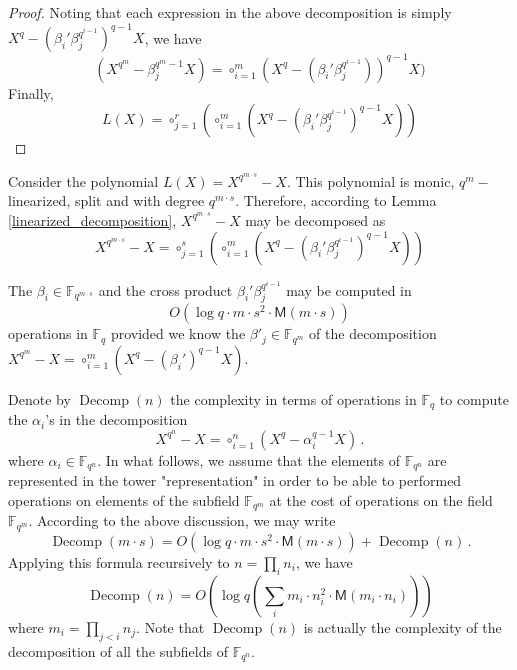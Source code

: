 \documentclass{sig-alternate}
\newcommand{\ff}[1]{\mathbb{F}_{#1}}
\newcommand{\qq}{q}
\newcommand{\nn}{n}
\newcommand{\qn}{{\qq^\nn}}
\newcommand{\basef}{\ff{\qq}}
\newcommand{\extf}{\ff{\qn}}
\DeclareMathOperator{\Decomp}{Decomp}
\newcommand{\bigO}{O}
\newcommand{\Mul}{\mathsf{M}}
\begin{document}
\begin{proof}
Noting that each expression in the above decomposition is simply $X^\qq-(  \beta_i'  \beta_j^{\qq^{i-1}})^{q-1}  X$, we have
\begin{equation}
\label{decomp_partial}
(X^{\qq^{m}}- \beta_j^{\qq^{m}-1} X)=\circ_{i=1}^{m} (X^\qq-(\beta_i' \beta_j^{\qq^{i-1}}) )^{q-1} X)
\end{equation}
Finally,
\begin{equation}
\label{decomp_total}
L(X)=\circ_{j=1}^{r} \left( \circ_{i=1}^{m} (X^\qq-(\beta_i'  \beta_j^{\qq^{i-1}})^{q-1}   X) \right)
\end{equation}
\medskip
\end{proof}



Consider the polynomial $L(X)=X^{\qq^{m \cdot s}}-X$. This polynomial is monic, $\qq^{m}-$linearized, split and with degree $\qq^{m \cdot s}$. Therefore, according to Lemma~
\ref{linearized_decomposition}, $X^{\qq^{m \cdot s}}-X$ may be decomposed as 
$$X^{\qq^{m\cdot s}}-X=\circ_{j=1}^{s} \left( \circ_{i=1}^{m} (X^\qq-(\beta_i'  \beta_j^{\qq^{i-1}})^{q-1}   X) \right)$$

The $\beta_i \in \mathbb{F}_{\qq^{m \cdot s}}$ and the cross product $\beta_i'  \beta_j^{\qq^{i-1}}$ may be computed in 
$$\bigO(\log q \cdot m \cdot s^2 \cdot \Mul(m \cdot s))$$
operations in $\basef$ provided we know the $\beta'_j \in \mathbb{F}_{\qq^m}$ of the decomposition $X^{\qq^{m}}-X=\circ_{i=1}^{m} (X^{\qq}-(\beta_i')^{\qq-1} X)$.

\medskip

Denote by $\Decomp(\nn)$ the complexity in terms of operations in $\basef$ to compute the $\alpha_i$'s in the decomposition 
$$X^{\qq^\nn}-X=\circ_{i=1}^{\nn} (X^q-\alpha_i^{q-1} X)\,.$$
where $\alpha_i \in \extf$. In what follows, we assume that the elements of $\mathbb{F}_{\qq^{\nn}}$ are represented in the tower "representation" in order to be able to 
performed operations on elements of the subfield $\mathbb{F}_{\qq^m}$ at the cost of operations on the field $\mathbb{F}_{\qq^m}$. According to the above discussion, we may write
$$\Decomp(m \cdot s)=\bigO(\log q \cdot m \cdot s^2 \cdot \Mul(m \cdot s))+\Decomp(n)\,.$$
Applying this formula recursively to $n=\prod_i n_i$, we have
$$\Decomp(n)=\bigO\left(\log q \left(\sum_i m_i \cdot n_i^2 \cdot \Mul(m_i \cdot n_i) \right) \right)$$
where $m_i=\prod_{j < i} n_j$. Note that  $\Decomp(\nn)$ is actually the complexity of the decomposition of all the subfields of $\extf$.
\end{document}
